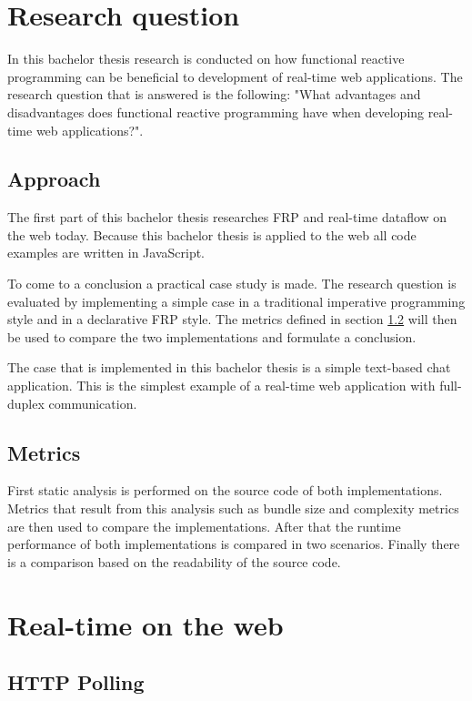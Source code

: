 \chapter{Research question}

In this bachelor thesis research is conducted on how functional reactive programming can be beneficial to development of real-time web applications. The research question that is answered is the following: "What advantages and disadvantages does functional reactive programming have when developing real-time web applications?".

\section{Approach}

The first part of this bachelor thesis researches FRP and real-time dataflow on the web today. Because this bachelor thesis is applied to the web all code examples are written in JavaScript.

To come to a conclusion a practical case study is made. The research question is evaluated by implementing a simple case in a traditional imperative programming style and in a declarative FRP style. The metrics defined in section \ref{sec:metrics} will then be used to compare the two implementations and formulate a conclusion.

The case that is implemented in this bachelor thesis is a simple text-based chat application. This is the simplest example of a real-time web application with full-duplex communication.

\section{Metrics}
\label{sec:metrics}

First static analysis is performed on the source code of both implementations. Metrics that result from this analysis such as bundle size and complexity metrics are then used to compare the implementations. After that the runtime performance of both implementations is compared in two scenarios. Finally there is a comparison based on the readability of the source code.

\chapter{Real-time on the web} %
\label{sec:realtime}

\section{HTTP Polling} %
\label{sub:polling}

